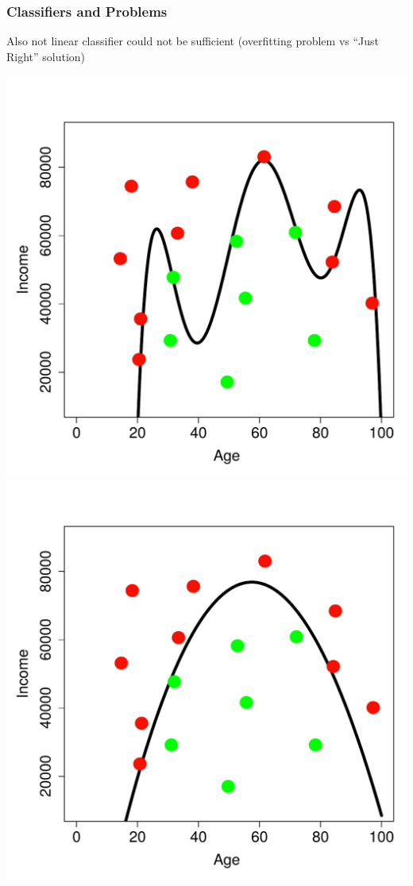 \documentclass{beamer}
\begin{document}
\begin{frame}
  \frametitle{Classifiers and Problems}
    Also not linear classifier could not be sufficient (overfitting problem vs ``Just Right'' solution)
  	\begin{center}
	\includegraphics[scale=0.3]{fmlpda_figure_1_3_c}
	\includegraphics[scale=0.3]{fmlpda_figure_1_3_d}
	\end{center}
\end{frame}
\end{document}
